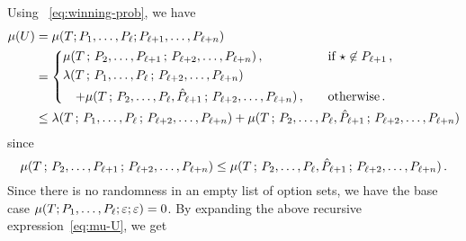     Using ~\eqref{eq:winning-prob}, we have
    \begin{align}
        \mu(U)
        &= \mu(T; P_1, \ldots, P_\ell; P_{\ell+1}, \ldots, P_{\ell+n}) \nonumber \\
        &= \begin{dcases}
            \mu(T\,;\,P_2, \ldots, P_{\ell+1} \,;\, P_{\ell+{2}}, \ldots, P_{\ell + n})\,,
                &\quad\text{if $\star \not \in P_{\ell + 1}$}\,,
                \\
            \lambda(T\,;\,P_{1}, \ldots, P_{\ell}\,;\, P_{\ell+{2}}, \ldots, P_{\ell + n}) \\
            \quad + \mu(T\,;\,P_{2}, \ldots, P_{\ell}, \hat{P}_{\ell + 1} \,;\, P_{\ell+{2}}, \ldots, P_{\ell + n})\,,
                &\quad\text{otherwise}
            \,.
        \end{dcases} \nonumber \\
        &\leq 
            \lambda(T\,;\,P_{1}, \ldots, P_{\ell}\,;\, P_{\ell+{2}}, \ldots, P_{\ell + n}) 
            + \mu(T\,;\,P_{2}, \ldots, P_{\ell}, \hat{P}_{\ell + 1} \,;\, P_{\ell+{2}}, \ldots, P_{\ell + n})
            \label{eq:mu-U}
    \end{align}
    since $$
    \mu(T\,;\,P_2, \ldots, P_{\ell+1} \,;\, P_{\ell+{2}}, \ldots, P_{\ell + n}) 
    \leq 
    \mu(T\,;\,P_{2}, \ldots, P_{\ell}, \hat{P}_{\ell + 1} \,;\, P_{\ell+{2}}, \ldots, P_{\ell + n})
    \,.
    $$
    Since there is no randomness in an empty list of option sets, 
    we have the base case 
    $\mu(T; P_1, \ldots, P_\ell; \varepsilon; \varepsilon) = 0$.
    By expanding the above recursive expression~\eqref{eq:mu-U}, we get 
